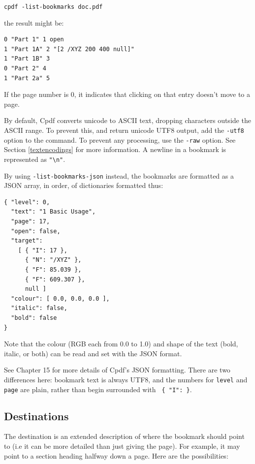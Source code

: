 \documentclass{book}
\begin{document}
\begin{framed}
  \noindent\small\verb!cpdf -list-bookmarks doc.pdf!
\end{framed}

\noindent the result might be:

\begin{framed}{\small\begin{verbatim}
0 "Part 1" 1 open
1 "Part 1A" 2 "[2 /XYZ 200 400 null]"
1 "Part 1B" 3
0 "Part 2" 4
1 "Part 2a" 5\end{verbatim}}\end{framed}

\noindent If the page number is 0, it indicates that clicking on that entry doesn't move to a page.

By default, Cpdf converts unicode to ASCII text, dropping characters outside
the ASCII range. To prevent this, and return unicode UTF8 output, add the
\texttt{-utf8} option to the command. To prevent any processing, use the
\texttt{-raw} option. See Section \ref{textencodings} for more information. A newline in a bookmark is represented as \texttt{"\textbackslash n"}.

By using \texttt{-list-bookmarks-json} instead, the bookmarks are formatted as a JSON array, in order, of dictionaries formatted thus:

\begin{verbatim}
{ "level": 0,
  "text": "1 Basic Usage",
  "page": 17,
  "open": false,
  "target":
    [ { "I": 17 },
      { "N": "/XYZ" },
      { "F": 85.039 },
      { "F": 609.307 },
      null ]
  "colour": [ 0.0, 0.0, 0.0 ],
  "italic": false,
  "bold": false
}
\end{verbatim}

\noindent Note that the colour (RGB each from 0.0 to 1.0) and shape of the text (bold, italic, or both) can be read and set with the JSON format.

See Chapter 15 for more details of Cpdf's JSON formatting. There are two differences here: bookmark text is always UTF8, and the numbers for \texttt{level} and \texttt{page} are plain, rather than begin surrounded with \texttt{ \{ "I": \}}.

\subsection{Destinations}

\label{destinations}
The destination is an extended description of where the bookmark should point to (i.e it can be more detailed than just giving the page). For example, it may point to a section heading halfway down a page. Here are the possibilities:
\end{document}
